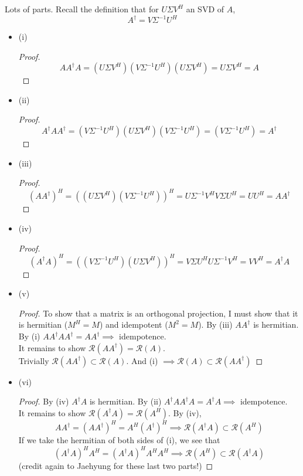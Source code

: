 \documentclass[12pt]{amsart}
\newenvironment{problem}[2][Problem]{\begin{trivlist}
\item[\hskip \labelsep {\bfseries #1}\hskip \labelsep {\bfseries #2.}]}{\end{trivlist}}
\begin{document}
\begin{problem}{38}
Lots of parts. Recall the definition that for $U \Sigma V^H$ an SVD of $A$, $$A^\dagger = V \Sigma^{-1} U^H$$
\begin{itemize}
\item (i) \begin{proof}
$$
AA^\dagger A = (U \Sigma V^H) (V \Sigma^{-1} U^H) (U \Sigma V^H) = U \Sigma V^H = A
$$
\end{proof}
\item (ii) \begin{proof}
$$A^\dagger A A^\dagger = (V \Sigma^{-1} U^H)(U \Sigma V^H) (V \Sigma^{-1} U^H) = (V \Sigma^{-1} U^H) = A^\dagger $$
\end{proof}
\item (iii) \begin{proof}
$$
(AA^\dagger)^H = ((U \Sigma V^H) (V \Sigma^{-1} U^H))^H = U \Sigma^{-1}V^H V \Sigma U^H = UU^H = AA^\dagger
$$
\end{proof}
\item (iv) \begin{proof}
$$
(A^\dagger A)^H = ((V \Sigma^{-1} U^H) (U \Sigma V^H))^H = V \Sigma U^H U \Sigma^{-1} V^H = VV^H = A^\dagger A
$$
\end{proof}
\item (v) \begin{proof}
To show that a matrix is an orthogonal projection, I must show that it is hermitian ($M^H = M$) and idempotent ($M^2 = M$).
By (iii) $A A^\dagger$ is hermitian. By (i) $AA^\dagger A A^\dagger = A A^\dagger \implies$ idempotence. \\
It remains to show $\mathcal{R}(AA^\dagger) = \mathcal{R} (A)$. \\
Trivially $\mathcal{R}(A A^\dagger) \subset \mathcal{R}(A)$. And (i) $\implies \mathcal{R}(A) \subset \mathcal{R}(A A^\dagger)$
\end{proof}
\item (vi) \begin{proof}
By (iv) $A^\dagger A$ is hermitian. By (ii) $A^\dagger A A^\dagger A = A^\dagger A \implies$ idempotence. \\
It remains to show $\mathcal{R}(A^\dagger A) = \mathcal{R} (A^H)$. By (iv),
$$AA^\dagger = (AA^\dagger)^H = A^H (A^\dagger)^H \implies \mathcal{R}(A^\dagger A) \subset \mathcal{R} (A^H) $$
If we take the hermitian of both sides of (i), we see that
$$ (A^\dagger A)^H A^H = (A^\dagger A)^H A^H A^H \implies \mathcal{R} (A^H) \subset \mathcal{R}(A^\dagger A) $$
(credit again to Jaehyung for these last two parts!)
\end{proof}
\end{itemize}
\end{problem}
\end{document}
